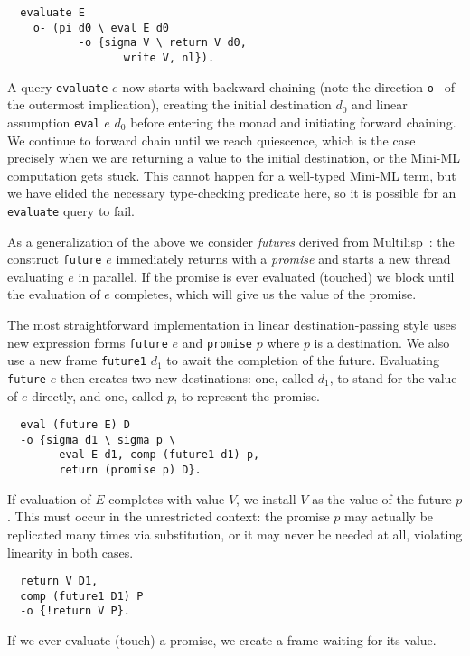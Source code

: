 \documentclass{sig-alt}
\begin{document}
\begin{small}\begin{verbatim}
  evaluate E
    o- (pi d0 \ eval E d0
           -o {sigma V \ return V d0,
                  write V, nl}).
\end{verbatim}\end{small}

A query \verb"evaluate" $e$ now starts with backward chaining (note the
direction \verb"o-" of the outermost implication), creating the initial
destination $d_0$ and linear assumption \verb"eval" $e$ $d_0$ before
entering the monad and initiating forward chaining.  We continue to
forward chain until we reach quiescence, which is the case precisely
when we are returning a value to the initial destination, or the Mini-ML
computation gets stuck.  This cannot happen for a well-typed Mini-ML
term, but we have elided the necessary
type-checking predicate here, so it is possible for an \verb"evaluate"
query to fail.

As a generalization of the above we consider \emph{futures} derived from
Multilisp~\cite{Halstead85}: the construct \verb"future" $e$ immediately
returns with a \emph{promise} and starts a new thread evaluating $e$ in
parallel.  If the promise is ever evaluated (touched) we block until the
evaluation of $e$ completes, which will give us the value of the
promise.

The most straightforward implementation in linear destination-passing
style uses new expression forms \verb"future" $e$ and \verb"promise" $p$ where
$p$ is a destination.  We also use a new frame \verb"future1" $d_1$ to
await the completion of the future. 
Evaluating \verb"future" $e$ then creates two
new destinations: one, called $d_1$, to stand for the value of 
$e$ directly, and one, called $p$, to represent the promise.

\begin{small}\begin{verbatim}
  eval (future E) D
  -o {sigma d1 \ sigma p \ 
        eval E d1, comp (future1 d1) p,
        return (promise p) D}.
\end{verbatim}\end{small}
\noindent
If evaluation of $E$ completes with value $V$, we install $V$
as the value of the future $p$.  This must occur in
the unrestricted context: the promise $p$ may actually be
replicated many times via substitution, or it may never be needed at
all, violating linearity in both cases.

\begin{small}\begin{verbatim}
  return V D1,
  comp (future1 D1) P
  -o {!return V P}.
\end{verbatim}\end{small}
\noindent
If we ever evaluate (touch) a promise, we create a frame waiting
for its value.
\end{document}

